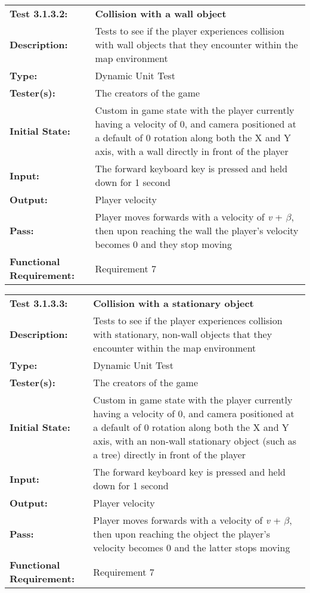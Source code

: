 \documentclass[12pt, titlepage]{article}
\begin{document}
\begin{mdframed}[linewidth=1pt]
\begin{tabularx}{\textwidth}{@{}p{3cm}X@{}}
{\bf Test 3.1.3.2:} & {\bf Collision with a wall object}\\[\baselineskip]
{\bf Description:} & Tests to see if the player experiences collision with wall objects that they encounter within the map environment\\[0.5\baselineskip]
{\bf Type:} & Dynamic Unit Test\\[0.5\baselineskip]
{\bf Tester(s):} & The creators of the game\\[0.5\baselineskip]
{\bf Initial State:} & Custom in game state with the player currently having a velocity of 0, and camera positioned at a default of 0 rotation along both the X and Y axis, with a wall directly in front of the player\\[0.5\baselineskip]
{\bf Input:} & The forward keyboard key is pressed and held down for 1 second \\[0.5\baselineskip]
{\bf Output:} & Player velocity\\[0.5\baselineskip]
{\bf Pass:} & Player moves forwards with a velocity of \textit{v} + $\beta$, then upon reaching the wall the player's velocity becomes 0 and they stop moving \\[0.5\baselineskip]
{\bf Functional Requirement:} & Requirement 7
\end{tabularx}
\end{mdframed}

\begin{mdframed}[linewidth=1pt]
\begin{tabularx}{\textwidth}{@{}p{3cm}X@{}}
{\bf Test 3.1.3.3:} & {\bf Collision with a stationary object}\\[\baselineskip]
{\bf Description:} & Tests to see if the player experiences collision with stationary, non-wall objects that they encounter within the map environment\\[0.5\baselineskip]
{\bf Type:} & Dynamic Unit Test\\[0.5\baselineskip]
{\bf Tester(s):} & The creators of the game\\[0.5\baselineskip]
{\bf Initial State:} & Custom in game state with the player currently having a velocity of 0, and camera positioned at a default of 0 rotation along both the X and Y axis, with an non-wall stationary object (such as a tree) directly in front of the player\\[0.5\baselineskip]
{\bf Input:} & The forward keyboard key is pressed and held down for 1 second \\[0.5\baselineskip]
{\bf Output:} & Player velocity\\[0.5\baselineskip]
{\bf Pass:} & Player moves forwards with a velocity of \textit{v} + $\beta$, then upon reaching the object the player's velocity becomes 0 and the latter stops moving \\[0.5\baselineskip]
{\bf Functional Requirement:} & Requirement 7
\end{tabularx}
\end{mdframed}
\end{document}
